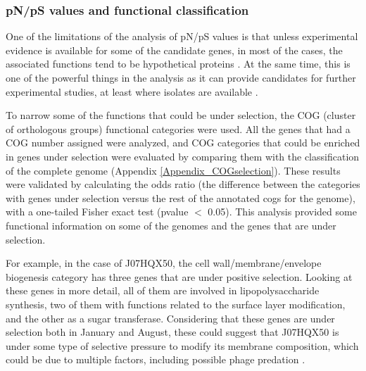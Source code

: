 \subsubsection{pN/pS values and functional classification}

One of the limitations of the analysis of pN/pS values is that unless experimental evidence is available for some of the candidate genes, in most of the cases, the associated functions tend to be hypothetical proteins \cite{Tai:2011jo}. At the same time, this is one of the powerful things in the analysis as it can provide candidates for further experimental studies, at least where isolates are available \cite{Fricke:2011gy}.

To narrow some of the functions that could be under selection, the COG (cluster of orthologous groups) functional categories were used. All the genes that had a COG number assigned were analyzed, and COG categories that could be enriched in genes under selection were evaluated by comparing them with the classification of the complete genome (Appendix \ref{Appendix_COGselection}). These results were validated by calculating the odds ratio (the difference between the categories with genes under selection versus the rest of the annotated cogs for the genome), with a one-tailed Fisher exact test (pvalue $<$ 0.05). This analysis provided some functional information on some of the genomes and the genes that are under selection. 

For example, in the case of J07HQX50, the cell wall/membrane/envelope biogenesis category has three genes that are under positive selection. Looking at these genes in more detail, all of them are involved in lipopolysaccharide synthesis, two of them with functions related to the surface layer modification, and the other as a sugar transferase. Considering that these genes are under selection both in January and August, these could suggest that J07HQX50 is under some type of selective pressure to modify its membrane composition, which could be due to multiple factors, including possible phage predation \cite{RodriguezValera:2009cr}.

